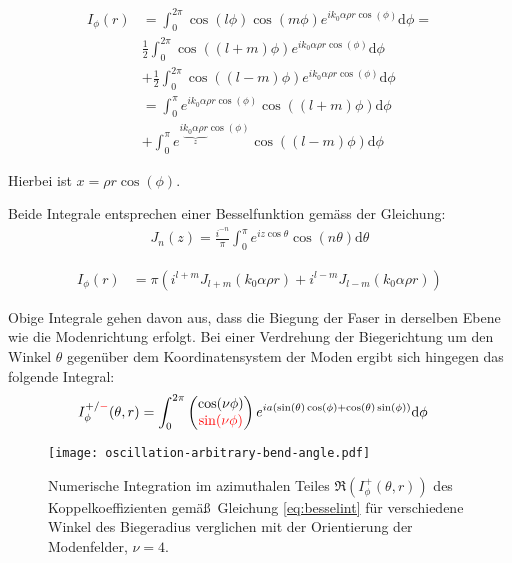 \documentclass{article}
\def\({\left(}
\def\){\right)}
\begin{document}
\begin{align}
  I_\phi(r) &= \int_0^{2\pi}\!\!\!\!\!\! \cos(l\phi)\cos(m\phi) e^{ik_0\alpha\rho r\cos(\phi)} \textrm{d}\phi = \nonumber \\
  &\frac{1}{2}\int_0^{2\pi}\!\!\!\!\!\! \cos\((l+m)\phi\) e^{ik_0\alpha\rho r\cos(\phi)} \textrm{d}\phi  \nonumber \\
  &+ \frac{1}{2}\int_0^{2\pi}\!\!\!\!\!\! \cos\((l-m)\phi\) e^{ik_0\alpha\rho r\cos(\phi)} \textrm{d}\phi \nonumber \\
  &=  \int_0^{\pi}\! e^{ik_0\alpha\rho r\cos(\phi)} \cos\((l+m)\phi\) \textrm{d}\phi  \nonumber \\
  &+ \int_0^{\pi}\! e^{i\underbrace{k_0\alpha\rho r}_z\cos(\phi)} \cos\((l-m)\phi\)  \textrm{d}\phi
\end{align}

Hierbei ist $x=\rho r \cos(\phi)$.

Beide Integrale entsprechen einer Besselfunktion gem\"ass der
Gleichung:
\begin{align}
  J_n(z) = \frac{i^{-n}}{\pi}\int_0^\pi e^{iz\cos\theta} \cos(n \theta) \textrm{d} \theta
\end{align}

\begin{align}
  I_\phi(r) &= \pi \(i^{l+m} J_{l+m}(k_0\alpha\rho r)+i^{l-m} J_{l-m}(k_0\alpha\rho r)\)
\end{align}

Obige Integrale gehen davon aus, dass die Biegung der Faser in
derselben Ebene wie die Modenrichtung erfolgt. Bei einer Verdrehung
der Biegerichtung um den Winkel $\theta$ gegen\"uber dem
Koordinatensystem der Moden ergibt sich hingegen das folgende
Integral:
\begin{align}
  \label{eq:besselint}
  I^{+/\textcolor{red}{-}}_\phi(\theta,r) &= \int_0^{2\pi}
  \begin{pmatrix}
    \cos(\nu\phi)\\
    \textcolor{red}{\sin(\nu\phi)}
  \end{pmatrix}
  e^{ia(\sin(\theta)\cos(\phi)+\cos(\theta)\sin(\phi))} \textrm{d}\phi 
\end{align}


\begin{figure}[!hbt]
  \centering
  \texttt{[image: oscillation-arbitrary-bend-angle.pdf]}
  \caption{Numerische Integration im azimuthalen Teiles $\Re\(I^+_\phi(\theta,r)\)$ des
    Koppelkoeffizienten gem\"a\ss\ Gleichung \eqref{eq:besselint}
    f\"ur verschiedene Winkel des Biegeradius verglichen mit der
    Orientierung der Modenfelder, $\nu=4$.}
  \label{fig:besselint}
\end{figure}
\end{document}
